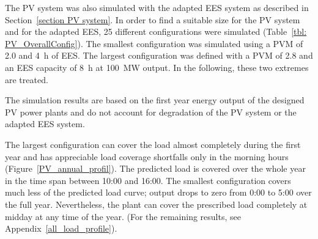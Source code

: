 The PV system was also simulated with the adapted EES system as described in Section~\ref{section PV system}. In order to find a suitable size for the PV system and for the adapted EES, 25 different configurations were simulated (Table~\ref{tbl: PV_OverallConfig}). The smallest configuration was simulated using a PVM of \num{2.0} and \SI{4}{h} of EES. The largest configuration was defined with a PVM of \num{2.8} and an EES capacity of \SI{8}{h} at \SI{100}{\mega\watt} output. In the following, these two extremes are treated. 


The simulation results are based on the first year energy output of the designed PV power plants and do not account for degradation of the PV system or the adapted EES system. 


The largest configuration can cover the load almost completely during the first year and has appreciable load coverage shortfalls only in the morning hours (Figure~\ref{PV_annual_profil}). The predicted load is covered over the whole year in the time span between 10:00 and 16:00. The smallest configuration covers much less of the predicted load curve; output drops to zero from 0:00 to 5:00 over the full year. Nevertheless, the plant can cover the prescribed load completely at midday at any time of the year. (For the remaining results, see Appendix~\ref{all_load_profile}).


